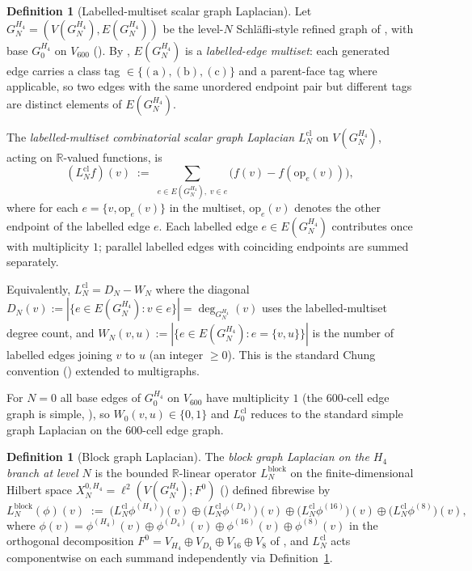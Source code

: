 \documentclass[11pt]{article}
\newcommand{\R}{\mathbb{R}}
\newcommand{\op}{\mathrm{op}}
\theoremstyle{definition}
\newtheorem{definition}[theorem]{Definition}
\begin{document}
\begin{definition}[Labelled-multiset scalar graph Laplacian]
\label{def:scalar-laplacian}
Let $G_N^{H_4} = (V(G_N^{H_4}), E(G_N^{H_4}))$ be the level-$N$
Schl\"{a}fli-style refined graph of
\cite[Definition~\texttt{def:refinement}]{RefinementSpaces},
with base $G_0^{H_4}$ on $V_{600}$
(\cite[Definition~\texttt{def:base-graphs}]{RefinementSpaces}).
By \cite[Definition~\texttt{def:refinement}]{RefinementSpaces},
$E(G_N^{H_4})$ is a \emph{labelled-edge multiset}: each generated
edge carries a class tag $\in \{(\mathrm{a}), (\mathrm{b}),
(\mathrm{c})\}$ and a parent-face tag where applicable, so two
edges with the same unordered endpoint pair but different tags
are distinct elements of $E(G_N^{H_4})$.

The \emph{labelled-multiset combinatorial scalar graph Laplacian}
$L^{\mathrm{cl}}_N$ on $V(G_N^{H_4})$, acting on $\R$-valued
functions, is
\[
  (L^{\mathrm{cl}}_N f)(v)
  \;:=\; \sum_{e \in E(G_N^{H_4}),\; v \in e}
         \bigl(f(v) - f(\op_e(v))\bigr),
\]
where for each $e = \{v, \op_e(v)\}$ in the multiset, $\op_e(v)$
denotes the other endpoint of the labelled edge $e$. Each labelled
edge $e \in E(G_N^{H_4})$ contributes once with multiplicity $1$;
parallel labelled edges with coinciding endpoints are summed
separately.

Equivalently, $L^{\mathrm{cl}}_N = D_N - W_N$ where the diagonal
$D_N(v) := |\{e \in E(G_N^{H_4}) : v \in e\}| =
\deg_{G_N^{H_4}}(v)$ uses the labelled-multiset degree count, and
$W_N(v, u) := |\{e \in E(G_N^{H_4}) : e = \{v, u\}\}|$ is the
number of labelled edges joining $v$ to $u$ (an integer
$\geq 0$). This is the standard Chung convention
(\cite[Ch.~1]{Chung}) extended to multigraphs.

For $N = 0$ all base edges of $G_0^{H_4}$ on $V_{600}$ have
multiplicity $1$ (the $600$-cell edge graph is simple,
\cite[\S 22.7]{CoxeterRegularPolytopes}), so $W_0(v, u) \in
\{0, 1\}$ and $L^{\mathrm{cl}}_0$ reduces to the standard simple
graph Laplacian on the $600$-cell edge graph.
\end{definition}

\begin{definition}[Block graph Laplacian]
\label{def:block-laplacian}
The \emph{block graph Laplacian on the $H_4$ branch at level $N$}
is the bounded $\R$-linear operator $L_N^{\mathrm{block}}$ on the
finite-dimensional Hilbert space
$X_N^{0, H_4} = \ell^2(V(G_N^{H_4}); F^0)$
(\cite[Definition~\texttt{def:Xn-0}]{RefinementSpaces}) defined
fibrewise by
\[
  L_N^{\mathrm{block}}(\phi)(v)
  \;:=\; \bigl(L^{\mathrm{cl}}_N \phi^{(H_4)}\bigr)(v)
        \oplus \bigl(L^{\mathrm{cl}}_N \phi^{(D_4)}\bigr)(v)
        \oplus \bigl(L^{\mathrm{cl}}_N \phi^{(16)}\bigr)(v)
        \oplus \bigl(L^{\mathrm{cl}}_N \phi^{(8)}\bigr)(v),
\]
where $\phi(v) = \phi^{(H_4)}(v) \oplus \phi^{(D_4)}(v) \oplus
\phi^{(16)}(v) \oplus \phi^{(8)}(v)$ in the orthogonal
decomposition $F^0 = V_{H_4} \oplus V_{D_4} \oplus V_{16} \oplus
V_8$ of \cite[Notation~\texttt{not:fibres}]{RefinementSpaces},
and $L^{\mathrm{cl}}_N$ acts componentwise on each summand
independently via Definition~\ref{def:scalar-laplacian}.
\end{definition}
\end{document}
